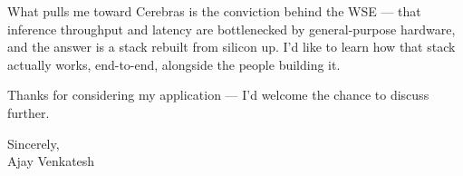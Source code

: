 \documentclass[letterpaper,11pt]{article}
\begin{document}
What pulls me toward Cerebras is the conviction behind the WSE --- that inference throughput and latency are bottlenecked by general-purpose hardware, and the answer is a stack rebuilt from silicon up. I'd like to learn how that stack actually works, end-to-end, alongside the people building it.

Thanks for considering my application --- I'd welcome the chance to discuss further.

\vspace{12pt}

Sincerely, \\
Ajay Venkatesh
\end{document}
